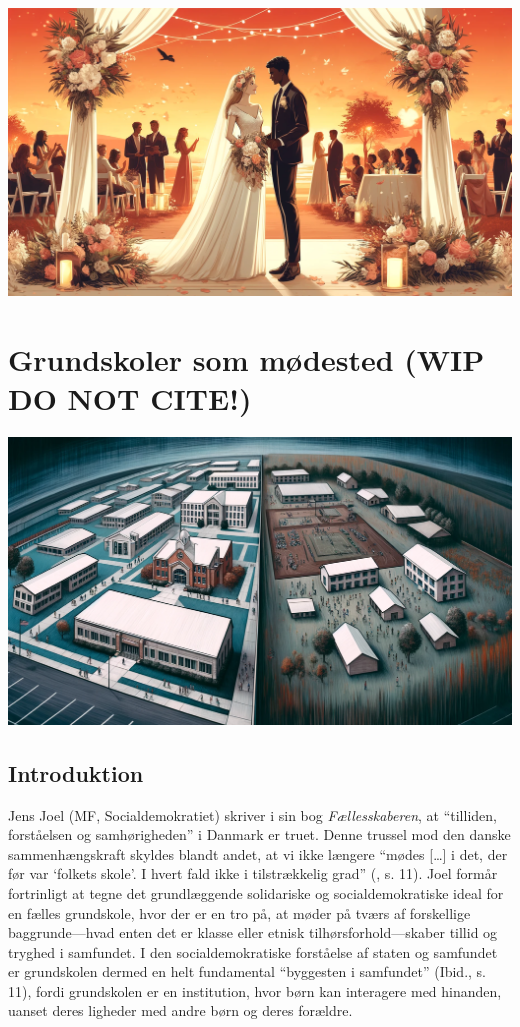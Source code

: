 \documentclass[
]{book}
\begin{document}
\includegraphics[width=1\linewidth]{images/dalle-wedding}

\chapter{\texorpdfstring{Grundskoler som mødested (\textbf{WIP DO NOT CITE!})}{Grundskoler som mødested (WIP DO NOT CITE!)}}\label{kap3}

\includegraphics[width=1\linewidth]{images/dalle-schoolseg}

\section{Introduktion}\label{introduktion}

Jens Joel (MF, Socialdemokratiet) skriver i sin bog \emph{Fællesskaberen}, at ``tilliden, forståelsen og samhørigheden'' i Danmark er truet. Denne trussel mod den danske sammenhængskraft skyldes blandt andet, at vi ikke længere ``mødes {[}\ldots{]} i det, der før var `folkets skole'. I hvert fald ikke i tilstrækkelig grad'' (, s. 11). Joel formår fortrinligt at tegne det grundlæggende solidariske og socialdemokratiske ideal for en fælles grundskole, hvor der er en tro på, at møder på tværs af forskellige baggrunde---hvad enten det er klasse eller etnisk tilhørsforhold---skaber tillid og tryghed i samfundet. I den socialdemokratiske forståelse af staten og samfundet er grundskolen dermed en helt fundamental ``byggesten i samfundet'' (Ibid., s. 11), fordi grundskolen er en institution, hvor børn kan interagere med hinanden, uanset deres ligheder med andre børn og deres forældre.
\end{document}
